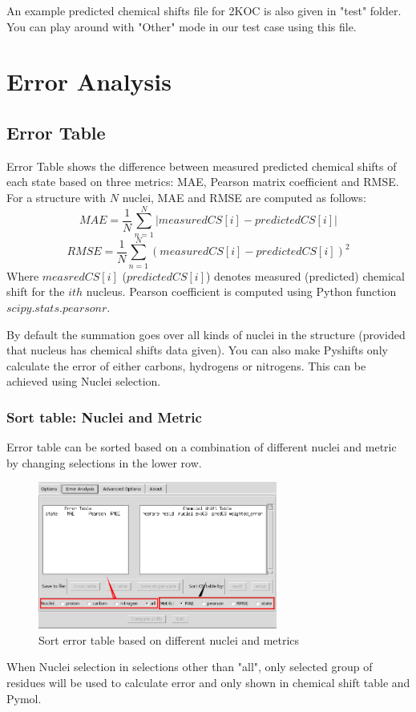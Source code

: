 \documentclass{article}
\begin{document}
An example predicted chemical shifts file for 2KOC is also given in "test" folder. You can play around with "Other" mode in our test case using this file.

\newpage
\section{Error Analysis}
\subsection{Error Table}
Error Table shows the difference between measured predicted chemical shifts of each state based on three metrics: MAE, Pearson matrix coefficient and RMSE. For a structure with $N$ nuclei, MAE and RMSE are computed as follows:
$$MAE = \frac{1}{N}\sum_{n=1}^{N} |measuredCS[i]-predictedCS[i]|$$
$$RMSE = \frac{1}{N}\sum_{n=1}^{N} (measuredCS[i]-predictedCS[i])^2$$
Where $measredCS[i]$ ($predictedCS[i]$) denotes measured (predicted) chemical shift for the $ith$ nucleus.
Pearson coefficient is computed using Python function $scipy.stats.pearsonr$.

By default the summation goes over all kinds of nuclei in the structure (provided that nucleus has chemical shifts data given). You can also make Pyshifts only calculate the error of either carbons, hydrogens or nitrogens. This can be achieved using Nuclei selection.

\subsubsection{Sort table: Nuclei and Metric}
Error table can be sorted based on a combination of different nuclei and metric by changing selections in the lower row.
\begin{figure}[htbp]
\centering
\includegraphics[width=0.7\textwidth]{sort_error_table_copy}
\caption{Sort error table based on different nuclei and metrics}
\label{fig:error_analysis_1}
\end{figure}
When Nuclei selection in selections other than "all", only selected group of residues will be used to calculate error and only shown in chemical shift table and Pymol.
\end{document}
